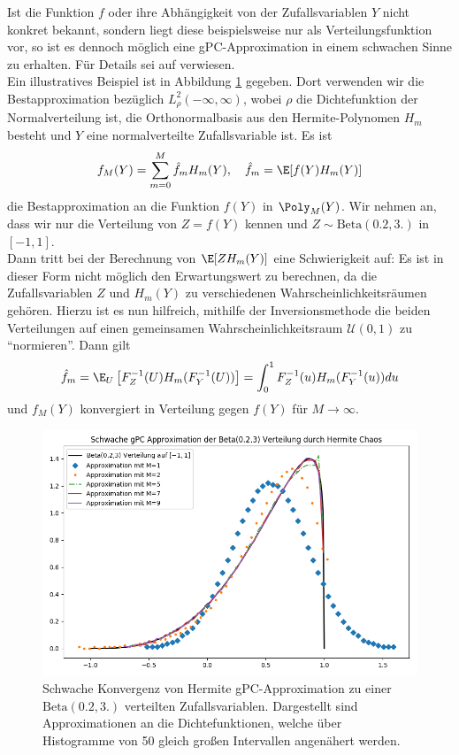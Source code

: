 \begin{mathbem}
Ist die Funktion $f$ oder ihre Abhängigkeit von der Zufallsvariablen $Y$ nicht konkret bekannt, sondern liegt diese beispielsweise nur als Verteilungsfunktion vor, so ist es dennoch möglich eine gPC-Approximation in einem schwachen Sinne zu erhalten. Für Details sei auf \autocite[Kapitel 5.1.2]{dongbinxiu2010} verwiesen.\\
Ein illustratives Beispiel ist in Abbildung \ref{fig:gpcweakconv} gegeben. Dort verwenden wir die Bestapproximation bezüglich $L_\rho^2(-\infty,\infty)$, wobei $\rho$ die Dichtefunktion der Normalverteilung ist, die Orthonormalbasis aus den Hermite-Polynomen $H_m$ besteht und $Y$ eine normalverteilte Zufallsvariable ist. Es ist
\[f_M(Y)=\sum_{m=0}^M\hat{f}_mH_m(Y), \quad \hat{f}_m=\E[f(Y)H_m(Y)]\]
die Bestapproximation an die Funktion $f(Y)$ in $\Poly_M(Y)$. Wir nehmen an, dass wir nur die Verteilung von $Z=f(Y)$ kennen und $Z\sim\text{Beta}(0.2,3.)$ in $[-1,1]$.\\
Dann tritt bei der Berechnung von $\E[ZH_m(Y)]$ eine Schwierigkeit auf: Es ist in dieser Form nicht möglich den Erwartungswert zu berechnen, da die Zufallsvariablen $Z$ und $H_m(Y)$ zu verschiedenen Wahrscheinlichkeitsräumen gehören. Hierzu ist es nun hilfreich, mithilfe der Inversionsmethode die beiden Verteilungen auf einen gemeinsamen Wahrscheinlichkeitsraum $\mathcal{U}(0,1)$ zu "`normieren"'. Dann gilt
\[\hat{f}_m=\E_U\left[F_Z^{-1}(U)H_m(F_Y^{-1}(U))\right]=\int_0^1F_Z^{-1}(u)H_m(F_Y^{-1}(u))du\]
und $f_M(Y)$ konvergiert in Verteilung gegen $f(Y)$ für $M\to\infty$.
\begin{figure}[!htb]
\includegraphics[width=\textwidth]{Figures/gpc_weak_convergence.png}
\caption{Schwache Konvergenz von Hermite gPC-Approximation zu einer $\text{Beta}(0.2,3.)$ verteilten Zufallsvariablen. Dargestellt sind Approximationen an die Dichtefunktionen, welche über Histogramme von 50 gleich großen Intervallen angenähert werden.}
\label{fig:gpcweakconv}
\end{figure}
\end{mathbem}

